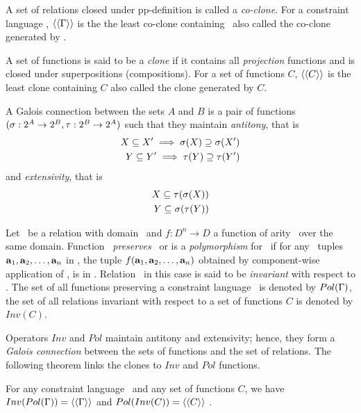 A set of relations closed under pp-definition is called a \emph{co-clone}.
For a constraint language \mrelset, \(\langle\langle \Gamma \rangle\rangle\) is the the least co-clone containing
\mrelset\ also called the co-clone generated by \mrelset\@.

A set of functions is said to be a \emph{clone} if it contains all \emph{projection}
functions and is closed under superpositions (compositions). For a set of functions
\(C\), \(\langle\langle C \rangle\rangle\) is the least clone containing \(C\) also called the clone generated by \(C\)\@.

A Galois connection between the sets \(A\) and \(B\) is a pair of functions
\((\sigma:2^{A} \to 2^{B}, \tau:2^{B} \to 2^{A})\) 
such that they maintain {\em antitony}, that is 
\begin{align*}
X \subseteq X' \implies \sigma(X) \supseteq \sigma(X') \\
Y \subseteq Y' \implies \tau(Y) \supseteq \tau(Y') \\
\end{align*}
and {\em extensivity}, that is
\begin{align*}
X \subseteq \tau(\sigma(X)) \\
Y \subseteq \sigma(\tau(Y))
\end{align*}

Let \mR\ be a relation with domain \mD\ and \(f:D^n\to D\) a function of arity \mn\ over the
same domain. Function \mf\ \emph{preserves} \mR\ or is a \emph{polymorphism} for \mR\ if
for any \mn\ tuples \(\textbf{a}_1,\textbf{a}_2,\dotsc,\textbf{a}_n\) in \mR, the tuple
\(f(\textbf{a}_1,\textbf{a}_2,\dotsc,\textbf{a}_n)\) obtained by component-wise application of \mf,
is in \mR\@. Relation \mR\ in this case is said to be \emph{invariant} with respect 
to \mf\@.
The set of all functions preserving a constraint language \mrelset\ is 
denoted by \(Pol(\Gamma)\), the set of all relations invariant with respect to a set of
functions  \(C\) is denoted by \(Inv(C)\)\@.

Operators \(Inv\) and \(Pol\) maintain antitony and extensivity; hence, they 
form a \emph{Galois connection} between the sets of functions 
and the set of relations. The following theorem links the clones to \(Inv\) and \(Pol\)
functions.

\begin{theorem}
For any constraint language \mrelset\ and 
any set of functions \(C\), 
we have \(Inv(Pol(\Gamma))=\langle\langle \Gamma \rangle\rangle\)
and
\(Pol(Inv(C))=\langle\langle C \rangle\rangle\)
\@.
\end{theorem}

